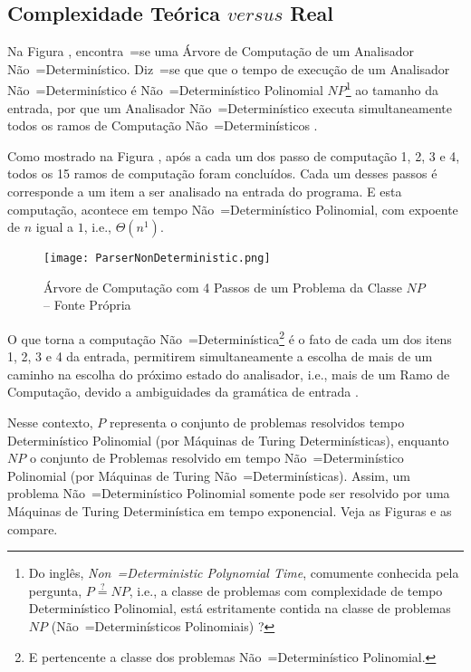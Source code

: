 \subsection{Complexidade Teórica $versus$ Real}

Na Figura ,
encontra~=se uma Árvore de Computação de um Analisador Não~=Determinístico.
Diz~=se que que o tempo de execução de um Analisador Não~=Determinístico é Não~=Determinístico Polinomial $NP$\footnote{
Do inglês, \textit{Non~=Deterministic Polynomial Time},
comumente conhecida pela pergunta,
$P \stackrel{?}{=} NP$, i.e.,
a classe de problemas com complexidade de tempo Determinístico Polinomial,
está estritamente contida na classe de problemas $NP$ (Não~=Determinísticos Polinomiais) \cite{computationalComplexityAuroraBarak}?
}
ao tamanho da entrada,
por que um Analisador Não~=Determinístico executa simultaneamente todos os ramos de Computação Não~=Determinísticos \cite{hopcroftBook}.

Como mostrado na Figura ,
após a cada um dos passo de computação 1,
2, 3 e 4,
todos os 15 ramos de computação foram concluídos.
Cada um desses passos é corresponde a um item a ser analisado na entrada do programa.
E esta computação,
acontece em tempo Não~=Determinístico Polinomial,
com expoente de $n$ igual a $1$,
i.e.,
$\Theta(n^1)$.
\begin{figure}[h]
\centering
\texttt{[image: ParserNonDeterministic.png]}
\caption[Árvore de Computação com 4 Passos de um Problema da Classe $NP$]{Árvore de Computação com 4 Passos de um Problema da Classe $NP$ -- Fonte Própria}
\label{ParserNonDeterministic}
\end{figure}

O que torna a computação Não~=Determinística\footnote{
E pertencente a classe dos problemas Não~=Determinístico Polinomial.
} é o fato de cada um dos itens 1,
2, 3 e 4 da entrada,
permitirem simultaneamente a escolha de mais de um caminho na escolha do próximo estado do analisador,
i.e.,
mais de um Ramo de Computação,
devido a ambiguidades da gramática de entrada \cite{antlrBookTerrentParr}.

Nesse contexto,
$P$ representa o conjunto de problemas resolvidos tempo Determinístico Polinomial (por Máquinas de Turing Determinísticas),
enquanto $NP$ o conjunto de Problemas resolvido em tempo Não~=Determinístico Polinomial (por Máquinas de Turing Não~=Determinísticas).
Assim,
um problema Não~=Determinístico Polinomial somente pode ser resolvido por uma Máquinas de Turing Determinística em tempo exponencial.
Veja as Figuras  e
as compare.

